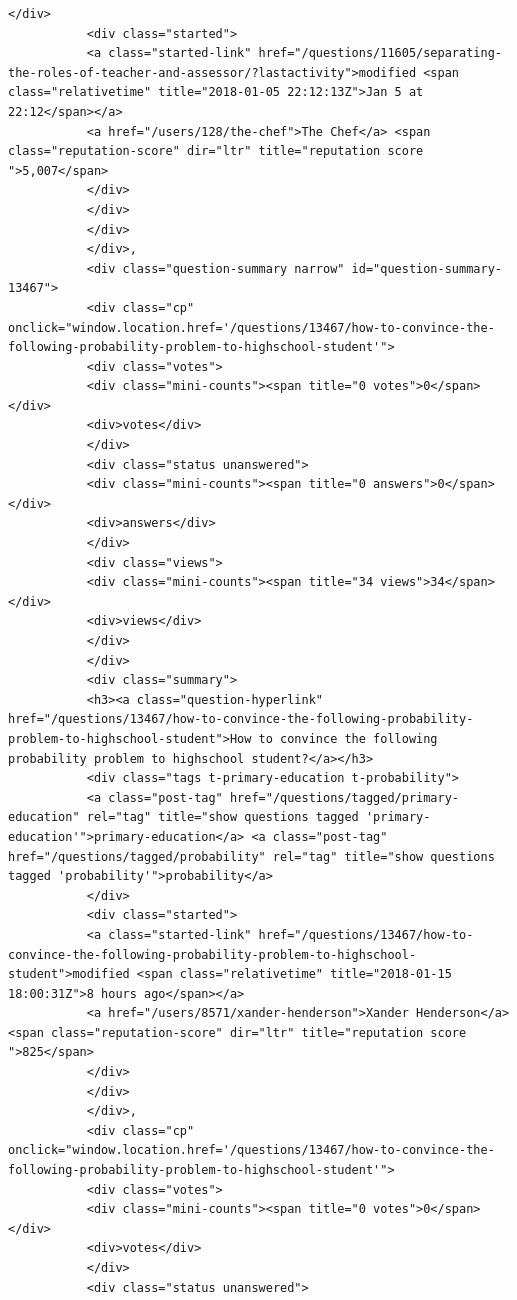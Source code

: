 \documentclass[11pt]{article}
\begin{document}
\begin{Verbatim}[commandchars=\\\{\}]
           </div>
           <div class="started">
           <a class="started-link" href="/questions/11605/separating-the-roles-of-teacher-and-assessor/?lastactivity">modified <span class="relativetime" title="2018-01-05 22:12:13Z">Jan 5 at 22:12</span></a>
           <a href="/users/128/the-chef">The Chef</a> <span class="reputation-score" dir="ltr" title="reputation score ">5,007</span>
           </div>
           </div>
           </div>
           </div>,
           <div class="question-summary narrow" id="question-summary-13467">
           <div class="cp" onclick="window.location.href='/questions/13467/how-to-convince-the-following-probability-problem-to-highschool-student'">
           <div class="votes">
           <div class="mini-counts"><span title="0 votes">0</span></div>
           <div>votes</div>
           </div>
           <div class="status unanswered">
           <div class="mini-counts"><span title="0 answers">0</span></div>
           <div>answers</div>
           </div>
           <div class="views">
           <div class="mini-counts"><span title="34 views">34</span></div>
           <div>views</div>
           </div>
           </div>
           <div class="summary">
           <h3><a class="question-hyperlink" href="/questions/13467/how-to-convince-the-following-probability-problem-to-highschool-student">How to convince the following probability problem to highschool student?</a></h3>
           <div class="tags t-primary-education t-probability">
           <a class="post-tag" href="/questions/tagged/primary-education" rel="tag" title="show questions tagged 'primary-education'">primary-education</a> <a class="post-tag" href="/questions/tagged/probability" rel="tag" title="show questions tagged 'probability'">probability</a>
           </div>
           <div class="started">
           <a class="started-link" href="/questions/13467/how-to-convince-the-following-probability-problem-to-highschool-student">modified <span class="relativetime" title="2018-01-15 18:00:31Z">8 hours ago</span></a>
           <a href="/users/8571/xander-henderson">Xander Henderson</a> <span class="reputation-score" dir="ltr" title="reputation score ">825</span>
           </div>
           </div>
           </div>,
           <div class="cp" onclick="window.location.href='/questions/13467/how-to-convince-the-following-probability-problem-to-highschool-student'">
           <div class="votes">
           <div class="mini-counts"><span title="0 votes">0</span></div>
           <div>votes</div>
           </div>
           <div class="status unanswered">

\end{Verbatim}
\end{document}
